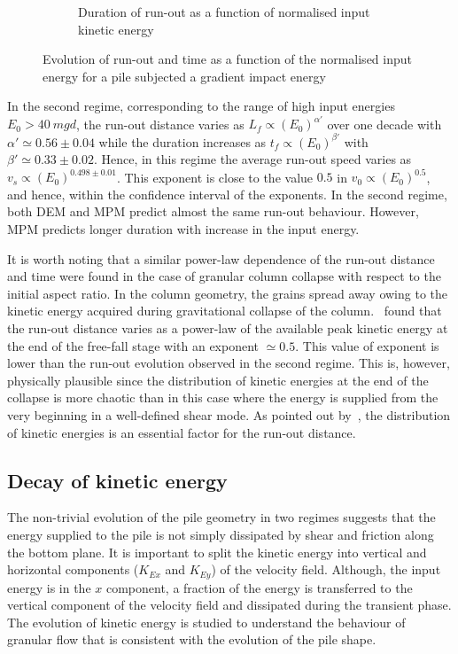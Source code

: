 \begin{figure}[tbph]
\begin{subfigure}[b]{0.975\textwidth}
\caption{Duration of run-out as a function of normalised input kinetic energy}
\label{fig:Tf_vs_Eo_Slope}
\end{subfigure}
\caption{Evolution of run-out and time as a function of the normalised input 
energy for a pile subjected a gradient impact energy}
\label{fig:Slope}
\end{figure}

In the second regime, corresponding to the range of high input energies  $E_0 > 
40 \ mgd$, the run-out distance varies as $L_f \propto (E_0)^{\alpha'}$ over 
one decade with $\alpha' \simeq 0.56\pm 0.04$ while the duration increases as 
$t_f \propto (E_0)^{\beta'}$ with $\beta' \simeq 0.33 \pm 0.02$. Hence, in this 
regime the average run-out speed varies as $v_s \propto (E_0)^{0.498 \pm 
0.01}$. This exponent is close to the value $0.5$ in $v_0 \propto (E_0)^{0.5}$, 
and hence, within the confidence interval of the exponents.
In the second regime, both DEM and MPM predict almost the same run-out 
behaviour. However, MPM predicts longer duration with increase in the input 
energy.

It is worth noting that a similar power-law dependence of the run-out distance 
and time were found in the case of granular column collapse with respect to 
the initial aspect ratio. In the column geometry, the grains spread away 
owing to the kinetic energy acquired during gravitational collapse of the 
column.~\citet{Topin2012} found that the run-out distance varies as a power-law 
of the available peak kinetic energy at the end of the free-fall stage with an 
exponent $\simeq 0.5$. This value of exponent is lower than the run-out 
evolution observed in the second regime. This is, however, physically plausible 
since the distribution of kinetic energies at the end of the collapse 
is more chaotic than in this case where the energy is supplied from the very 
beginning in a well-defined shear mode. As pointed out by~\citet{Staron2005}, 
the distribution of kinetic energies is an essential factor for the run-out 
distance.

\subsection{Decay of kinetic energy}
\label{sec:decay}

The non-trivial evolution of the pile geometry in two regimes suggests that 
the energy supplied to the pile is not simply dissipated by shear and friction 
along the bottom plane. It is important to split the kinetic energy into 
vertical and horizontal components ($K_{Ex}$ and $K_{Ey}$) of the velocity 
field. Although, the input energy is in the $x$ component, a fraction of 
the energy is transferred to the vertical component of the velocity field and 
dissipated during the transient phase. The evolution of kinetic energy is 
studied to understand the behaviour of granular flow that is consistent with 
the evolution of the pile shape.


